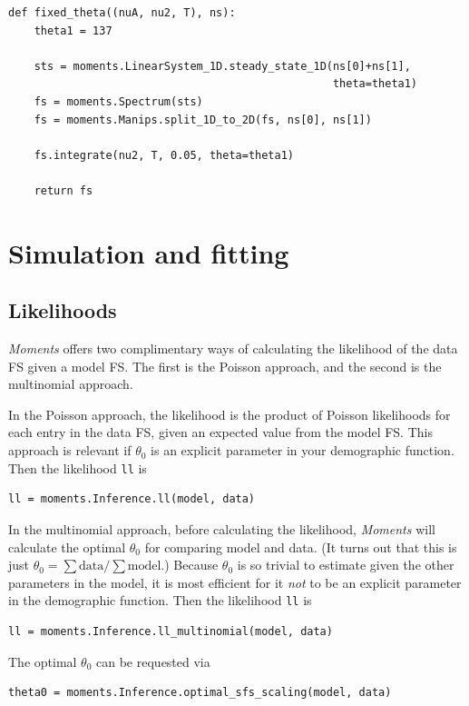 \documentclass[12pt]{article}
\makeatletter
\newcommand{\py}[1]{\lstinline[breaklines=true,language=Python, showstringspaces=False]@#1@}
\makeatother
\begin{document}
\begin{lstlisting}[caption={\textbf{Fixed $\boldsymbol{\theta}$:} A split demographic model function with a fixed value of $\theta$=137 for derived population 1. The free parameters are the sizes of the ancestral pop, \py{nuA}, and derived pop 2, \py{nu2}, (relative to derived pop 1), along with the divergence time \py{T} between the two derived pops.}, label={lst:fixed_theta}, float]
def fixed_theta((nuA, nu2, T), ns):
    theta1 = 137
    
    sts = moments.LinearSystem_1D.steady_state_1D(ns[0]+ns[1],
                                                  theta=theta1)
    fs = moments.Spectrum(sts)
    fs = moments.Manips.split_1D_to_2D(fs, ns[0], ns[1])
                                
    fs.integrate(nu2, T, 0.05, theta=theta1)

    return fs
\end{lstlisting}

\clearpage

\section{Simulation and fitting}

\subsection{Likelihoods}

\textit{Moments} offers two complimentary ways of calculating the likelihood of the data FS given a model FS.
The first is the Poisson approach, and the second is the multinomial approach.

In the Poisson approach, the likelihood is the product of Poisson likelihoods for each entry in the data FS, given an expected value from the model FS.
This approach is relevant if $\theta_0$ is an explicit parameter in your demographic function.
Then the likelihood \py{ll} is
\begin{lstlisting}
ll = moments.Inference.ll(model, data)
\end{lstlisting}

In the multinomial approach, before calculating the likelihood, \textit{Moments} will calculate the optimal $\theta_0$ for comparing model and data.
(It turns out that this is just $\theta_0 = \sum \text{data} / \sum \text{model}$.)
Because $\theta_0$ is so trivial to estimate given the other parameters in the model, it is most efficient for it \emph{not} to be an explicit parameter in the demographic function.
Then the likelihood \py{ll} is
\begin{lstlisting}
ll = moments.Inference.ll_multinomial(model, data)
\end{lstlisting}
The optimal $\theta_0$ can be requested via
\begin{lstlisting}
theta0 = moments.Inference.optimal_sfs_scaling(model, data)
\end{lstlisting}
\end{document}
